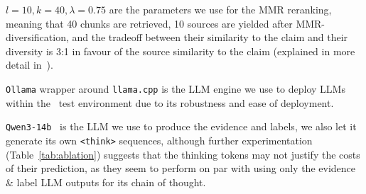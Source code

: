 $l=10, k=40, \lambda=0.75$ are the parameters we use for the MMR reranking, meaning that 40 chunks are retrieved, 10 sources are yielded after MMR-diversification, and the tradeoff between their similarity to the claim and their diversity is 3:1 in favour of the source similarity to the claim (explained in more detail in~\citealt{ullrich-etal-2024-aic}). 

\texttt{Ollama} wrapper around \texttt{llama.cpp} is the LLM engine we use to deploy LLMs within the \averitec~test environment due to its robustness and ease of deployment.

\texttt{Qwen3-14b}~\cite{yang2025qwen3technicalreport} is the LLM we use to produce the evidence and labels, we also let it generate its own \texttt{<think>} sequences, although further experimentation (Table~\ref{tab:ablation}) suggests that the thinking tokens may not justify the costs of their prediction, as they seem to perform on par with using only the evidence \& label LLM outputs for its chain of thought.